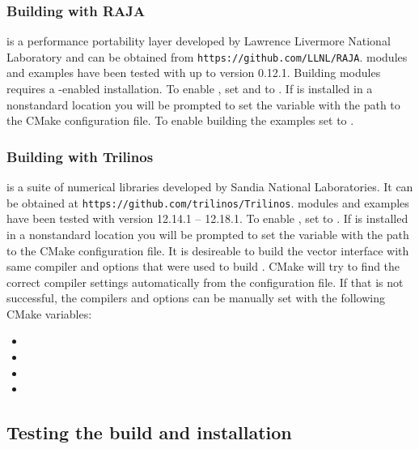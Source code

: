 \subsubsection*{Building with RAJA}
{\raja} is a performance portability layer developed by Lawrence Livermore
National Laboratory and can be obtained from {\tt https://github.com/LLNL/RAJA}.
{\sundials} {\raja} modules and examples have been tested with {\raja} up to
version 0.12.1. Building {\sundials} {\raja} modules requires a {\cuda}-enabled
{\raja} installation. To enable {\raja}, set  and
 to . If {\raja} is installed in a nonstandard location
you will be prompted to set the variable  with the path to the
{\raja} CMake configuration file. To enable building the {\raja} examples set
 to .

\subsubsection*{Building with Trilinos}
{\trilinos} is a suite of numerical libraries developed by Sandia National
Laboratories. It can be obtained at {\tt https://github.com/trilinos/Trilinos}.
{\sundials} {\trilinos} modules and examples have been tested with {\trilinos}
version 12.14.1 -- 12.18.1. To enable {\trilinos}, set
 to . If {\trilinos} is
installed in a nonstandard location you will be prompted to set the
variable  with the path to the {\trilinos} CMake
configuration file. It is desireable to build the {\trilinos} vector interface
with same compiler and options that were used to build {\trilinos}.
CMake will try to find the correct compiler settings automatically from the
{\trilinos} configuration file. If that is not successful,
the compilers and options can be manually set with the following CMake variables:
\begin{itemize}
\item
{}
\item
{}
\item
{}
\item
{}
\end{itemize}

\subsection{Testing the build and installation}

